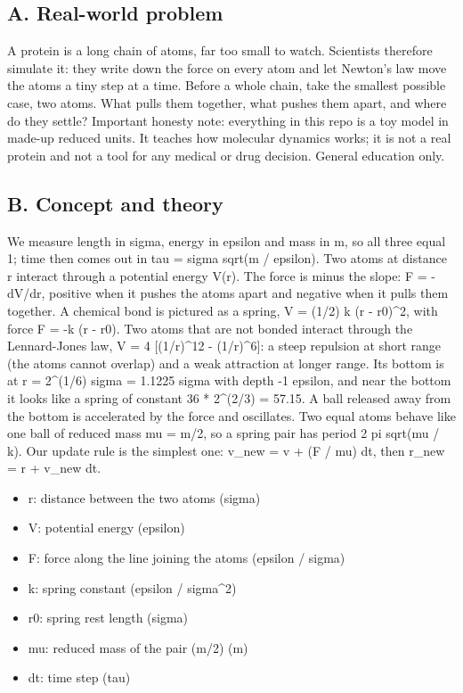 \documentclass[11pt,a4paper]{article}
\begin{document}
\subsection*{A. Real-world problem}
A protein is a long chain of atoms, far too small to watch. Scientists therefore simulate it: they write down the force on every atom and let Newton's law move the atoms a tiny step at a time. Before a whole chain, take the smallest possible case, two atoms. What pulls them together, what pushes them apart, and where do they settle? Important honesty note: everything in this repo is a toy model in made-up reduced units. It teaches how molecular dynamics works; it is not a real protein and not a tool for any medical or drug decision. General education only.

\subsection*{B. Concept and theory}
We measure length in sigma, energy in epsilon and mass in m, so all three equal 1; time then comes out in tau = sigma sqrt(m / epsilon). Two atoms at distance r interact through a potential energy V(r). The force is minus the slope: F = -dV/dr, positive when it pushes the atoms apart and negative when it pulls them together. A chemical bond is pictured as a spring, V = (1/2) k (r - r0)\textasciicircum{}2, with force F = -k (r - r0). Two atoms that are not bonded interact through the Lennard-Jones law, V = 4 [(1/r)\textasciicircum{}12 - (1/r)\textasciicircum{}6]: a steep repulsion at short range (the atoms cannot overlap) and a weak attraction at longer range. Its bottom is at r = 2\textasciicircum{}(1/6) sigma = 1.1225 sigma with depth -1 epsilon, and near the bottom it looks like a spring of constant 36 * 2\textasciicircum{}(2/3) = 57.15. A ball released away from the bottom is accelerated by the force and oscillates. Two equal atoms behave like one ball of reduced mass mu = m/2, so a spring pair has period 2 pi sqrt(mu / k). Our update rule is the simplest one: v\_new = v + (F / mu) dt, then r\_new = r + v\_new dt.

\begin{itemize}[nosep]
\item r: distance between the two atoms (sigma)
\item V: potential energy (epsilon)
\item F: force along the line joining the atoms (epsilon / sigma)
\item k: spring constant (epsilon / sigma\textasciicircum{}2)
\item r0: spring rest length (sigma)
\item mu: reduced mass of the pair (m/2) (m)
\item dt: time step (tau)
\end{itemize}
\end{document}
